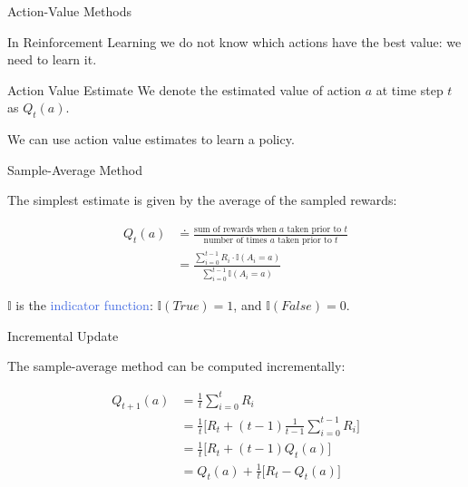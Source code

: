 \documentclass{beamer}
\begin{document}
\begin{frame}{Action-Value Methods}

In Reinforcement Learning we do not know which actions have the best value: we need to learn it.

\vspace{2mm}

\begin{block}{Action Value Estimate}		
We denote the estimated value of action $a$ at time step $t$ as $Q_t(a)$.
\end{block}

\vspace{2mm}

We can use action value estimates to learn a policy.


\end{frame}

\begin{frame}{Sample-Average Method}

The simplest estimate is given by the average of the sampled rewards:

\begin{align*}
	Q_t(a) &\doteq \frac{\text{sum of rewards when $a$ taken prior to $t$}}{\text{number of times $a$ taken prior to $t$} }\\
	   & = \frac{\sum_{i=0}^{t-1} R_i \cdot \mathds I(A_i = a)}{\sum_{i=0}^{t-1} \mathds I(A_i = a)}
\end{align*}

$\mathds I$ is the \textcolor{RoyalBlue}{indicator function}: $\mathds I(True) = 1$, and $\mathds I(False) = 0$.
 
\end{frame}


\begin{frame}{Incremental Update}

The sample-average method can be computed incrementally:

\begin{align*}
	Q_{t+1}(a) &= \frac{1}{t} \sum_{i=0}^{t} R_i \\
	           &= \frac{1}{t} \bigg[ R_t + (t-1)\frac{1}{t-1}\sum_{i=0}^{t-1} R_i \bigg]\\
	           &= \frac{1}{t} \bigg[ R_t + (t-1) Q_t(a) \bigg ]\\
	           &= Q_t(a) + \frac{1}{t}  \bigg[ R_t - Q_t(a)  \bigg ]
\end{align*}


\end{frame}
\end{document}
